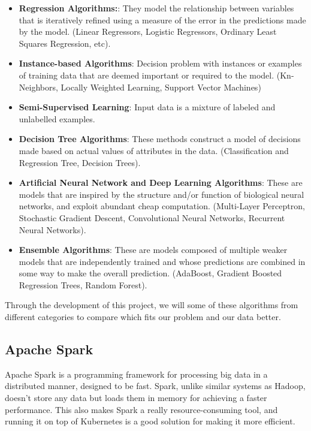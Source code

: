 \begin{itemize}
	\item \textbf{Regression Algorithms:}:  They model the relationship between variables that is iteratively refined using a measure of the error in the predictions made by the model. (Linear Regressors, Logistic Regressors, Ordinary Least Squares Regression, etc).
	\item \textbf{Instance-based Algorithms}: Decision problem with instances or examples of training data that are deemed important or required to the model. (Kn-Neighbors, Locally Weighted Learning, Support Vector Machines)
	\item \textbf{Semi-Supervised Learning}: Input data is a mixture of labeled and unlabelled examples.
	\item \textbf{Decision Tree Algorithms}: These methods construct a model of decisions made based on actual values of attributes in the data. (Classification and Regression Tree, Decision Trees).
	\item \textbf{Artificial Neural Network and Deep Learning Algorithms}: These are models that are inspired by the structure and/or function of biological neural networks, and exploit abundant cheap computation. (Multi-Layer Perceptron, Stochastic Gradient Descent, Convolutional Neural Networks, Recurrent Neural Networks).
	\item \textbf{Ensemble Algorithms}: These are models composed of multiple weaker models that are 
	independently trained and whose predictions are combined in some way to make the overall prediction. (AdaBoost, Gradient Boosted Regression Trees, Random Forest).
\end{itemize}

Through the development of this project, we will some of these algorithms from different categories to compare which fits our problem and our data better.
 
\subsection{Apache Spark}

Apache Spark \cite{spark} is a programming framework for processing big data in a distributed manner, designed to be fast. Spark, unlike similar systems as Hadoop, doesn't store any data but loads them in memory for achieving a faster performance. This also makes Spark a really resource-consuming tool, and running it on top of Kubernetes is a good solution for making it more efficient.

